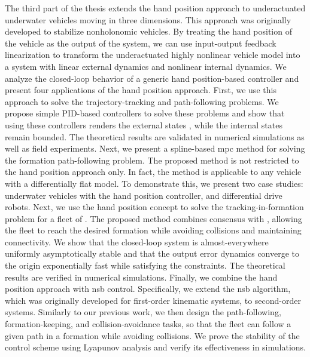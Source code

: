 The third part of the thesis extends the hand position approach to underactuated underwater vehicles moving in three dimensions.
This approach was originally developed to stabilize nonholonomic vehicles.
By treating the hand position of the vehicle as the output of the system, we can use input-output feedback linearization to transform the underactuated highly nonlinear vehicle model into a system with linear external dynamics and nonlinear internal dynamics.
We analyze the closed-loop behavior of a generic hand position-based controller and present four applications of the hand position approach.
First, we use this approach to solve the trajectory-tracking and path-following problems.
We propose simple PID-based controllers to solve these problems and show that using these controllers renders the external states , while the internal states remain bounded.
The theoretical results are validated in numerical simulations as well as field experiments.
Next, we present a spline-based \acrlong{mpc} method for solving the formation path-following problem.
The proposed method is not restricted to the hand position approach only.
In fact, the method is applicable to any vehicle with a differentially flat model.
To demonstrate this, we present two case studies: underwater vehicles with the hand position controller, and differential drive robots.
Next, we use the hand position concept to solve the tracking-in-formation problem for a fleet of .
The proposed method combines consensus with , allowing the fleet to reach the desired formation while avoiding collisions and maintaining connectivity.
We show that the closed-loop system is almost-everywhere uniformly asymptotically stable and that the output error dynamics converge to the origin exponentially fast while satisfying the constraints.
The theoretical results are verified in numerical simulations.
Finally, we combine the hand position approach with \acrlong{nsb} control.
Specifically, we extend the \acrlong{nsb} algorithm, which was originally developed for first-order kinematic systems, to second-order systems.
Similarly to our previous work, we then design the path-following, formation-keeping, and collision-avoidance tasks, so that the fleet can follow a given path in a formation while avoiding collisions.
We prove the stability of the control scheme using Lyapunov analysis and verify its effectiveness in simulations. 
